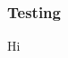 \documentclass[11pt]{beamer}
\begin{document}
    \begin{frame}
        \frametitle{Testing }
    
        Hi
    
    \end{frame}
\end{document}
